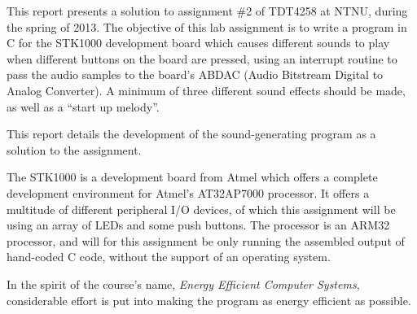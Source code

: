 This report presents a solution to assignment \#2 of TDT4258 at NTNU, during the spring of 2013.
The objective of this lab assignment is to write a program in C for the STK1000 development board which causes different sounds to play when different buttons on the board are pressed, using an interrupt routine to pass the audio samples to the board's ABDAC (Audio Bitstream Digital to Analog Converter).
A minimum of three different sound effects should be made, as well as a ``start up melody''.

This report details the development of the sound-generating program as a solution to the assignment.

The STK1000 is a development board from Atmel which offers a complete development environment for Atmel's AT32AP7000 processor.
It offers a multitude of different peripheral I/O devices, of which this assignment will be using an array of LEDs and some push buttons.
The processor is an ARM32 processor, and will for this assignment be only running the assembled output of hand-coded C code, without the support of an operating system.

In the spirit of the course's name, \emph{Energy Efficient Computer Systems}, considerable effort is put into making the program as energy efficient as possible.

